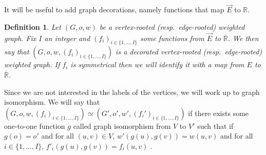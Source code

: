 \documentclass[11pt]{article}
\newtheorem{definition}[prop]{Definition}
\begin{document}
It will be useful to add graph decorations, namely functions that map  $\overset{\rightarrow }{E}$ to $\mathbb{R}$.
\begin{definition} \label{def:decograph}
    Let $(G,o,w)$ be a vertex-rooted (resp.\ edge-rooted) weighted graph. Fix $I$ an integer and $(f_i)_{i \in \{1,...,I\}}$ some functions from $\overset{\rightarrow}{E}$ to $\overline{\mathbb{R}}$. We then say that
    $(G,o,w,(f_i)_{i \in \{1,...,I\}})$ is a \emph{decorated} vertex-rooted (resp.\ edge-rooted) weighted graph.  If $f_i$ is symmetrical then we will identify it with a map from $E$ to $\overline{\mathbb{R}}$.
\end{definition}

Since we are not interested in the labels of the vertices, we will work up to graph isomorphism.
We will say that $(G,o,w,(f_i)_{i \in \{1,...,I\}}) \simeq (G',o',w',(f_i')_{i \in \{1,...,I\}})$ if there exists some one-to-one function $g$ called graph isomorphism from $V$ to $V'$ such that if $g(o)=o'$ and for all $(u,v) \in V$, $w'(g(u),g(v))=w(u,v)$ and for all $ i \in \{1,...,I\}$, $f'_i(g(u),g(v))=f_i(u,v)$ .
\end{document}
